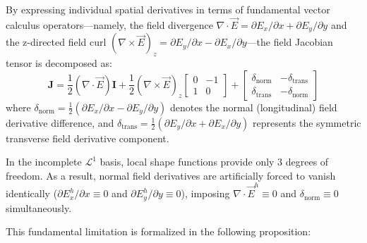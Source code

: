 \documentclass[preprint,12pt]{elsarticle}
\begin{document}
By expressing individual spatial derivatives in terms of fundamental vector calculus operators---namely, the field divergence $\nabla \cdot \vec{E} = \partial E_x/\partial x + \partial E_y/\partial y$ and the z-directed field curl $(\nabla \times \vec{E})_z = \partial E_y/\partial x - \partial E_x/\partial y$---the field Jacobian tensor is decomposed as:
\begin{equation}
\mathbf{J} = \frac{1}{2}(\nabla \cdot \vec{E}) \mathbf{I} + \frac{1}{2}(\nabla \times \vec{E})_z \begin{bmatrix} 0 & -1 \\ 1 & 0 \end{bmatrix} + \begin{bmatrix} \delta_{\mathrm{norm}} & -\delta_{\mathrm{trans}} \\ \delta_{\mathrm{trans}} & -\delta_{\mathrm{norm}} \end{bmatrix}
\label{eq:jacobian_tensor_EM_decomposition}
\end{equation}
where $\delta_{\mathrm{norm}} = \frac{1}{2}(\partial E_x/\partial x - \partial E_y/\partial y)$ denotes the normal (longitudinal) field derivative difference, and $\delta_{\mathrm{trans}} = \frac{1}{2}(\partial E_y/\partial x + \partial E_x/\partial y)$ represents the symmetric transverse field derivative component.

In the incomplete $\mathcal{L}^1$ basis, local shape functions provide only 3 degrees of freedom. As a result, normal field derivatives are artificially forced to vanish identically ($\partial E_x^h/\partial x \equiv 0$ and $\partial E_y^h/\partial y \equiv 0$), imposing $\nabla \cdot \vec{E}^h \equiv 0$ and $\delta_{\mathrm{norm}} \equiv 0$ simultaneously.

This fundamental limitation is formalized in the following proposition:
\end{document}
